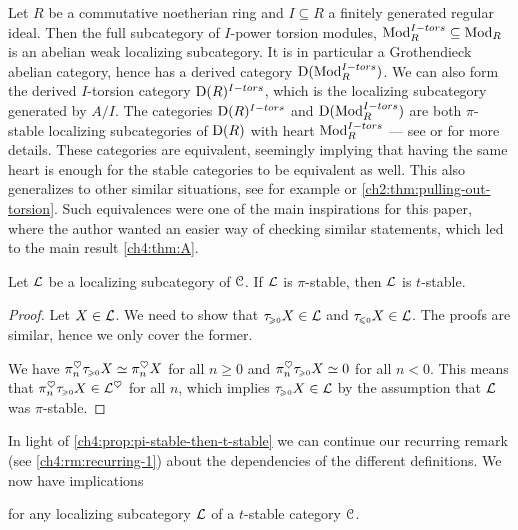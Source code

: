 \begin{example}
    \label{ch4:ex:abelian-torsion}
    Let $R$ be a commutative noetherian ring and $I\subseteq R$ a finitely generated regular ideal. Then the full subcategory of $I$-power torsion modules, $\mathrm{Mod}_R^{I-tors}\subseteq \mathrm{Mod}_R$ is an abelian weak localizing subcategory. It is in particular a Grothendieck abelian category, hence has a derived category $\mathrm{D}(\mathrm{Mod}_R^{I-tors})$. We can also form the derived $I$-torsion category $\mathrm{D}(R)^{I-tors}$, which is the localizing subcategory generated by $A/I$. The categories $\mathrm{D}(R)^{I-tors}$ and $\mathrm{D}(\mathrm{Mod}_R^{I-tors})$ are both $\pi$-stable localizing subcategories of $\mathrm{D}(R)$ with heart $\mathrm{Mod}_R^{I-tors}$ --- see \cite{greenlees-may_92} or \cite{barthel-heard-valenzuela_2018} for more details. These categories are equivalent, seemingly implying that having the same heart is enough for the stable categories to be equivalent as well. This also generalizes to other similar situations, see for example \cite[3.15, 3.17]{barthel-heard-valenzuela_2020} or \cref{ch2:thm:pulling-out-torsion}. Such equivalences were one of the main inspirations for this paper, where the author wanted an easier way of checking similar statements, which led to the main result \cref{ch4:thm:A}. 
\end{example}

\begin{proposition}
    \label{ch4:prop:pi-stable-then-t-stable}
    Let $\mathcal{L}$ be a localizing subcategory of $\EuScript{C}$. If $\mathcal{L}$ is $\pi$-stable, then $\mathcal{L}$ is $t$-stable. 
\end{proposition}
\begin{proof}
    Let $X\in \mathcal{L}$. We need to show that $\tau_{\hspace{-1pt}\scriptscriptstyle\geqslant 0} X\in \mathcal{L}$ and $\tau_{\hspace{-1pt}\scriptscriptstyle\leqslant 0} X\in \mathcal{L}$. The proofs are similar, hence we only cover the former. 
    
    We have $\pi_n^\heartsuit \tau_{\hspace{-1pt}\scriptscriptstyle\geqslant 0} X \simeq \pi_n^\heartsuit X$ for all $n\geq 0$ and $\pi_n^\heartsuit \tau_{\hspace{-1pt}\scriptscriptstyle\geqslant 0} X\simeq 0$ for all $n<0$. This means that $\pi_n^\heartsuit \tau_{\hspace{-1pt}\scriptscriptstyle\geqslant 0} X \in \mathcal{L}^\heartsuit$ for all $n$, which implies $\tau_{\hspace{-1pt}\scriptscriptstyle\geqslant 0} X \in \mathcal{L}$ by the assumption that $\mathcal{L}$ was $\pi$-stable. 
\end{proof}

\begin{remark}
    \label{ch4:rm:recurring-2}
    In light of \cref{ch4:prop:pi-stable-then-t-stable} we can continue our recurring remark (see \cref{ch4:rm:recurring-1}) about the dependencies of the different definitions. We now have implications
    \begin{center}
    \end{center}
    for any localizing subcategory $\mathcal{L}$ of a $t$-stable category $\EuScript{C}$. 
\end{remark}

